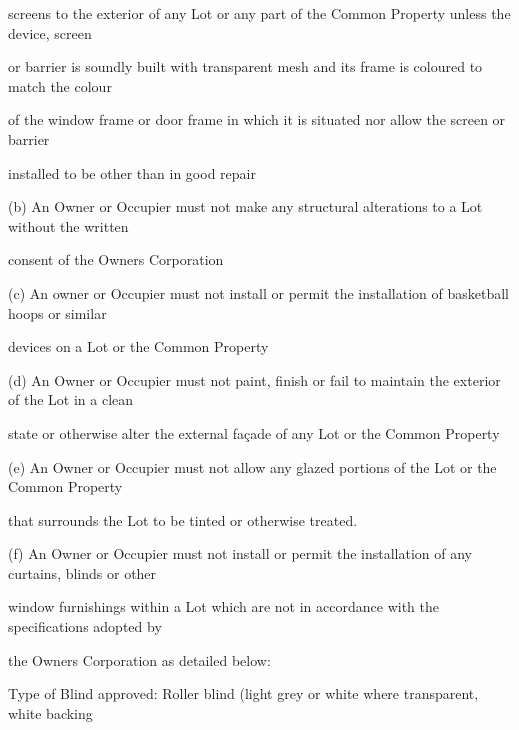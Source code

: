 \documentclass{article}
\begin{document}
{\fontsize{10.02}{1}screens to the exterior of any Lot or any part of the Common Property unless the device, screen }

{\fontsize{10.02}{1}or barrier is soundly built with transparent mesh and its frame is coloured to match the colour }

{\fontsize{10.02}{1}of the window frame or door frame in which it is situated nor allow the screen or barrier }

{\fontsize{10.02}{1}installed to be other than in good repair }

{\fontsize{9.962}{1}(b) An Owner or Occupier must not make any structural alterations to a Lot without the written }

{\fontsize{10.02}{1}consent of the Owners Corporation }

{\fontsize{9.962}{1}(c) An owner or Occupier must not install or permit the installation of basketball hoops or similar }

{\fontsize{10.02}{1}devices on a Lot or the Common Property }

\newpage


















{\fontsize{9.962}{1}(d) An Owner or Occupier must not paint, finish or fail to maintain the exterior of the Lot in a clean }

{\fontsize{10.02}{1}state or otherwise alter the external façade of any Lot or the Common Property }

{\fontsize{9.962}{1}(e) An Owner or Occupier must not allow any glazed portions of the Lot or the Common Property }

{\fontsize{10.02}{1}that surrounds the Lot to be tinted or otherwise treated. }

{\fontsize{9.962}{1}(f) An Owner or Occupier must not install or permit the installation of any curtains, blinds or other }

{\fontsize{10.02}{1}window furnishings within a Lot which are not in accordance with the specifications adopted by }

{\fontsize{10.02}{1}the Owners Corporation as detailed below: }

{\fontsize{10.02}{1}Type of Blind approved: Roller blind (light grey or white where transparent, white backing }
\end{document}
